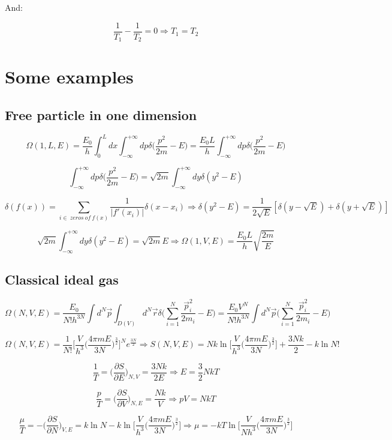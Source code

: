 	And:

	$$\frac{1}{T_1}-\frac{1}{T_2} = 0\Rightarrow T_1 = T_2$$

\section{Some examples}

	\subsection{Free particle in one dimension}

	$$\Omega(1, L, E) = \frac{E_0}{h}\int_0^Ldx\int_{-\infty}^{+\infty}dp\delta\biggl(\frac{p^2}{2m}-E\biggr) = \frac{E_0L}{h}\int_{-\infty}^{+\infty}dp\delta\biggl(\frac{p^2}{2m}-E\biggr)$$

	$$\int_{-\infty}^{+\infty}dp\delta\biggl(\frac{p^2}{2m}-E\biggr) = \sqrt{2m}\int_{-\infty}^{+\infty}dy\delta(y^2-E)$$

	$$\delta(f(x)) = \sum\limits_{i\in\ zeros\ of\ f(x)}\frac{1}{|f'(x_i)|}\delta(x-x_i)\Rightarrow\delta(y^2-E) = \frac{1}{2\sqrt{E}}[\delta(y-\sqrt{E}) + \delta(y+\sqrt{E})]$$

	$$\sqrt{2m}\int_{-\infty}^{+\infty}dy\delta(y^2-E) = \sqrt{2m}{E}\Rightarrow\Omega(1, V, E) = \frac{E_0L}{h}\sqrt{\frac{2m}{E}}$$

	\subsection{Classical ideal gas}

	$$\Omega(N, V, E) = \frac{E_0}{N!h^{3N}}\int d^N\vec{p}\int_{D(V)}d^N\vec{r}\delta\biggl(\sum\limits_{i=1}^N\frac{\vec{p}^2_i}{2m_i}-E\biggr) = \frac{E_0V^N}{N!h^{3N}}\int d^N\vec{p}\biggl(\sum\limits_{i=1}^N\frac{\vec{p}_i^2}{2m_i}-E\biggr)$$

	$$\Omega(N, V, E) = \frac{1}{N!}\biggl[\frac{V}{h^3}\biggl(\frac{4\pi m E}{3N}\biggr)^{\frac{3}{2}}\biggr]^Ne^{\frac{3N}{2}}\Rightarrow S(N, V, E) = Nk\ln\biggl[\frac{V}{h^3}\biggl(\frac{4\pi mE}{3N}\biggr)^{\frac{3}{2}}\biggr] + \frac{3Nk}{2}-k\ln N!$$

	$$\frac{1}{T} = \biggl(\frac{\partial S}{\partial E}\biggr)_{N, V} = \frac{3Nk}{2E}\Rightarrow E = \frac{3}{2}NkT$$

	$$\frac{p}{T} = \biggl(\frac{\partial S}{\partial V}\biggr)_{N, E} = \frac{Nk}{V}\Rightarrow pV = NkT$$

	$$\frac{\mu}{T} = -\biggl(\frac{\partial S}{\partial N}\biggr)_{V, E} = k\ln N-k\ln\biggl[\frac{V}{h^3}\biggl(\frac{4\pi mE}{3N}\biggr)^{\frac{3}{2}}\biggr] \Rightarrow \mu = -kT\ln\biggl[\frac{V}{Nh^3}\biggl(\frac{4\pi m E}{3N}\biggr)^{\frac{3}{2}}\biggr]$$

